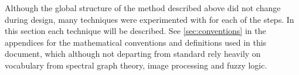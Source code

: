 Although the global structure of the method described above did not change during design, many techniques were experimented with for each of the steps. In this section each technique will be described. See \autoref{sec:conventions} in the appendices for the mathematical conventions and definitions used in this document, which although not departing from standard rely heavily on vocabulary from spectral graph theory, image processing and fuzzy logic.





